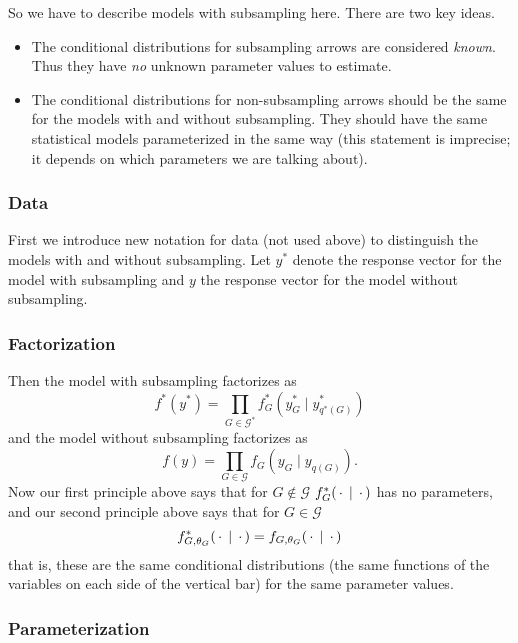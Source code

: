 So we have to describe models with subsampling here.
There are two key ideas.
\begin{itemize}
\item The conditional distributions for subsampling arrows are considered
\emph{known}.
Thus they have \emph{no} unknown parameter values to estimate.
\item The conditional distributions for non-subsampling arrows should be
the same for the models with and without subsampling.  They should have
the same statistical models parameterized in the same way
(this statement is imprecise; it depends on which parameters
we are talking about).
\end{itemize}

\subsubsection{Data}

First we introduce new notation for data (not used above) to distinguish
the models with and without subsampling.  Let $y^*$ denote the response
vector for the model with subsampling and $y$ the response
vector for the model without subsampling.

\subsubsection{Factorization}

Then the model with subsampling factorizes as
\begin{equation} \label{eq:factorization-with}
   f^*(y^*) = \prod_{G \in \mathcal{G}^*} f^*_G(y^*_G \mid y^*_{q^*(G)})
\end{equation}
and the model without subsampling factorizes as
\begin{equation} \label{eq:factorization-without}
   f(y) = \prod_{G \in \mathcal{G}} f_G(y_G \mid y_{q(G)}).
\end{equation}
Now our first principle above says that for $G \notin \mathcal{G}$
$f^*_G(\,\cdot\, \mid \,\cdot\,)$ has no parameters,
and our second principle above says that for $G \in \mathcal{G}$
$$
   f^*_{G, \theta_G}(\,\cdot\, \mid \,\cdot\,)
   =
   f_{G, \theta_G}(\,\cdot\, \mid \,\cdot\,)
$$
that is, these are the same conditional distributions (the same functions
of the variables on each side of the vertical bar) for the same parameter
values.

\subsubsection{Parameterization}

